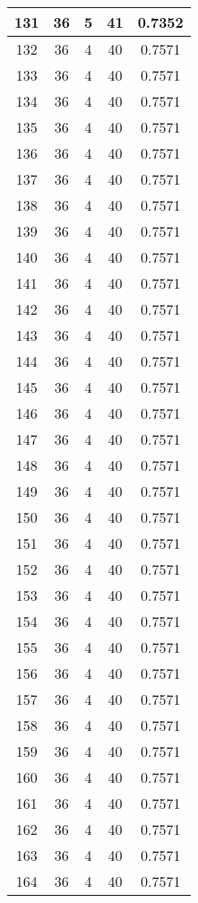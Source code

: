 \documentclass[letterpaper, 12pt]{article}
\begin{document}
\begin{longtable}{|c|c|c|c|c|}
\hline
131 & 36 & 5 & 41 & 0.7352 \\
\hline
132 & 36 & 4 & 40 & 0.7571 \\
\hline
133 & 36 & 4 & 40 & 0.7571 \\
\hline
134 & 36 & 4 & 40 & 0.7571 \\
\hline
135 & 36 & 4 & 40 & 0.7571 \\
\hline
136 & 36 & 4 & 40 & 0.7571 \\
\hline
137 & 36 & 4 & 40 & 0.7571 \\
\hline
138 & 36 & 4 & 40 & 0.7571 \\
\hline
139 & 36 & 4 & 40 & 0.7571 \\
\hline
140 & 36 & 4 & 40 & 0.7571 \\
\hline
141 & 36 & 4 & 40 & 0.7571 \\
\hline
142 & 36 & 4 & 40 & 0.7571 \\
\hline
143 & 36 & 4 & 40 & 0.7571 \\
\hline
144 & 36 & 4 & 40 & 0.7571 \\
\hline
145 & 36 & 4 & 40 & 0.7571 \\
\hline
146 & 36 & 4 & 40 & 0.7571 \\
\hline
147 & 36 & 4 & 40 & 0.7571 \\
\hline
148 & 36 & 4 & 40 & 0.7571 \\
\hline
149 & 36 & 4 & 40 & 0.7571 \\
\hline
150 & 36 & 4 & 40 & 0.7571 \\
\hline
151 & 36 & 4 & 40 & 0.7571 \\
\hline
152 & 36 & 4 & 40 & 0.7571 \\
\hline
153 & 36 & 4 & 40 & 0.7571 \\
\hline
154 & 36 & 4 & 40 & 0.7571 \\
\hline
155 & 36 & 4 & 40 & 0.7571 \\
\hline
156 & 36 & 4 & 40 & 0.7571 \\
\hline
157 & 36 & 4 & 40 & 0.7571 \\
\hline
158 & 36 & 4 & 40 & 0.7571 \\
\hline
159 & 36 & 4 & 40 & 0.7571 \\
\hline
160 & 36 & 4 & 40 & 0.7571 \\
\hline
161 & 36 & 4 & 40 & 0.7571 \\
\hline
162 & 36 & 4 & 40 & 0.7571 \\
\hline
163 & 36 & 4 & 40 & 0.7571 \\
\hline
164 & 36 & 4 & 40 & 0.7571 \\

\end{longtable}
\end{document}
